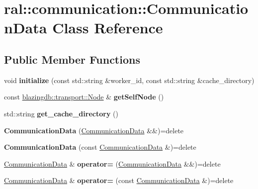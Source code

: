 \hypertarget{classral_1_1communication_1_1CommunicationData}{}\section{ral\+:\+:communication\+:\+:Communication\+Data Class Reference}
\label{classral_1_1communication_1_1CommunicationData}
\subsection*{Public Member Functions}
\begin{DoxyCompactItemize}
\item 
\mbox{\label{classral_1_1communication_1_1CommunicationData_a54127850ce370846d7bec8838ac5977d}} 
void {\bfseries initialize} (const std\+::string \&worker\+\_\+id, const std\+::string \&cache\+\_\+directory)
\item 
\mbox{\label{classral_1_1communication_1_1CommunicationData_a3760edb8d01a37ea1d2f4a22f79667c7}} 
const \hyperlink{classblazingdb_1_1transport_1_1Node}{blazingdb\+::transport\+::\+Node} \& {\bfseries get\+Self\+Node} ()
\item 
\mbox{\label{classral_1_1communication_1_1CommunicationData_a3ba22fbadc0e8ab7fa3ce3f4d2f14bde}} 
std\+::string {\bfseries get\+\_\+cache\+\_\+directory} ()
\item 
\mbox{\label{classral_1_1communication_1_1CommunicationData_a06c1035a65f9f6732967f664c91046df}} 
{\bfseries Communication\+Data} (\hyperlink{classral_1_1communication_1_1CommunicationData}{Communication\+Data} \&\&)=delete
\item 
\mbox{\label{classral_1_1communication_1_1CommunicationData_a921fb32cebb3abcd7b21e2100b5628c6}} 
{\bfseries Communication\+Data} (const \hyperlink{classral_1_1communication_1_1CommunicationData}{Communication\+Data} \&)=delete
\item 
\mbox{\label{classral_1_1communication_1_1CommunicationData_a4e2f21a1e92329d1b7352e4778785841}} 
\hyperlink{classral_1_1communication_1_1CommunicationData}{Communication\+Data} \& {\bfseries operator=} (\hyperlink{classral_1_1communication_1_1CommunicationData}{Communication\+Data} \&\&)=delete
\item 
\mbox{\label{classral_1_1communication_1_1CommunicationData_aa9fbd91e8d7d16b5075f037ddb01786f}} 
\hyperlink{classral_1_1communication_1_1CommunicationData}{Communication\+Data} \& {\bfseries operator=} (const \hyperlink{classral_1_1communication_1_1CommunicationData}{Communication\+Data} \&)=delete
\end{DoxyCompactItemize}
